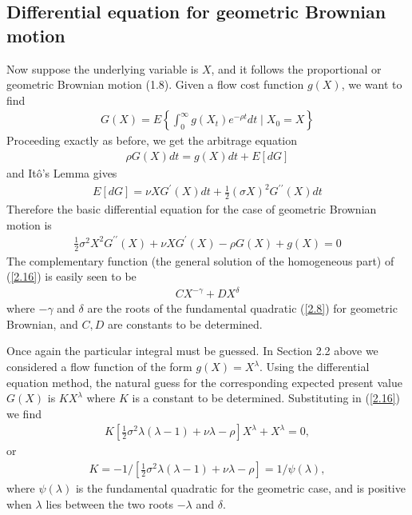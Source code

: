 \documentclass[12pt]{article}
\theoremstyle{definition}
\begin{document}
\subsection{Differential equation for geometric Brownian motion}
Now suppose the underlying variable is $X$, and it follows the proportional or geometric Brownian motion (1.8). Given a flow cost function $g(X)$, we want to find
\begin{align}
G(X)=E\left\{\int_{0}^{\infty} g\left(X_{t}\right) e^{-\rho t} d t \mid X_{0}=X\right\} \label{2.15}
\end{align}
Proceeding exactly as before, we get the arbitrage equation
\begin{align*}
\rho G(X) d t=g(X) dt+E[dG]
\end{align*}
and Itô's Lemma gives
\begin{align*}
E[dG]=\nu X G^{\prime}(X) dt+\frac{1}{2}(\sigma X)^{2} G^{\prime \prime}(X) dt
\end{align*}
Therefore the basic differential equation for the case of geometric Brownian motion is
\begin{align}
\frac{1}{2} \sigma^{2} X^{2} G^{\prime \prime}(X)+\nu X G^{\prime}(X)-\rho G(X)+g(X)=0 \label{2.16}
\end{align}
The complementary function (the general solution of the homogeneous part) of (\ref{2.16}) is easily seen to be
\begin{align}
C X^{-\gamma}+D X^{\delta} \label{2.17}
\end{align}
where $-\gamma$ and $\delta$ are the roots of the fundamental quadratic (\ref{2.8}) for geometric Brownian, and $C, D$ are constants to be determined.

Once again the particular integral must be guessed. In Section 2.2 above we considered a flow function of the form $g(X)=X^{\lambda}$. Using the differential equation method, the natural guess for the corresponding expected present value $G(X)$ is $K X^{\lambda}$ where $K$ is a constant to be determined. Substituting in (\ref{2.16}) we find
\begin{align*}
K\left[\frac{1}{2} \sigma^{2} \lambda(\lambda-1)+\nu \lambda-\rho\right] X^{\lambda}+X^{\lambda}=0,
\end{align*}
or
\begin{align*}
K=-1 /\left[\frac{1}{2} \sigma^{2} \lambda(\lambda-1)+\nu \lambda-\rho\right]=1 / \psi(\lambda),
\end{align*}
where $\psi(\lambda)$ is the fundamental quadratic for the geometric case, and is positive when $\lambda$ lies between the two roots $-\lambda$ and $\delta$.
\end{document}
